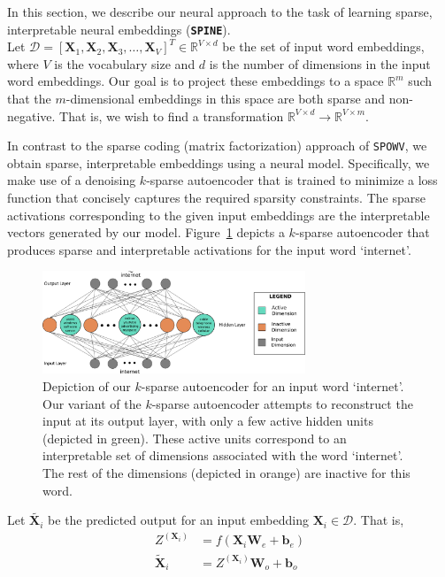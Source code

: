 \documentclass[letterpaper]{article} %
\begin{document}
In this section, we describe our neural approach to the task of learning sparse, interpretable neural embeddings (\textbf{\texttt{SPINE}}).\\
Let $\mathcal{D} = [\mathbf{X}_1, \mathbf{X}_2, \mathbf{X}_3, \dots, \mathbf{X}_V]^T \in \mathbb{R}^{V \times d}$ be the set of input word embeddings, where $V$ is the vocabulary size and $d$ is the number of dimensions in the input word embeddings. Our goal is to project these embeddings to a space $\mathbb{R}^m$ such that the $m$-dimensional embeddings in this space are both sparse and non-negative. That is, we wish to find a transformation $\mathbb{R}^{V \times d} \rightarrow \mathbb{R}^{V \times m}$.

In contrast to the sparse coding (matrix factorization) approach of \texttt{SPOWV}, we obtain sparse, interpretable embeddings using a neural model. Specifically, we make use of a denoising $k$-sparse autoencoder that is trained to minimize a loss function that concisely captures the required sparsity constraints. The sparse activations corresponding to the given input embeddings are the interpretable vectors generated by our model. Figure~\ref{fig:autoencoder} depicts a $k$-sparse autoencoder that produces sparse and interpretable activations for the input word `internet'.

\begin{figure}[ht]
\centering
\includegraphics[width=0.70\textwidth]{autoencoder_detailed}
\caption{Depiction of our $k$-sparse autoencoder for an input word `internet'. Our variant of the $k$-sparse autoencoder attempts to reconstruct the input at its output layer,
with only a few active hidden units (depicted in green). These active units correspond to an interpretable set of dimensions associated with the word `internet'. The rest of the dimensions (depicted in orange) are inactive for this word.}
\label{fig:autoencoder}
\end{figure}

Let $\widetilde{\mathbf{X}_i}$ be the predicted output for an input embedding $\mathbf{X}_i \in \mathcal{D}$. That is,
\begin{align*}
	Z^{(\mathbf{X}_i)} &= f(\mathbf{X}_i \mathbf{W}_e + \mathbf{b}_e) \\
    \widetilde{\mathbf{X}}_i &= Z^{(\mathbf{X}_i)} \mathbf{W}_o + \mathbf{b}_o
\end{align*}
\end{document}
